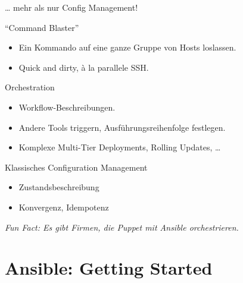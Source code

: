 \begin{frame}{\dots{} mehr als nur Config Management!}
  \begin{block}{"`Command Blaster"'}
    \begin{itemize}
      \item Ein Kommando auf eine ganze Gruppe von Hosts loslassen.
      \item Quick and dirty, à la parallele SSH.
    \end{itemize}
  \end{block}
  
  \begin{block}{Orchestration\footnotemark}
    \begin{itemize}
      \item Workflow-Beschreibungen.
      \item Andere Tools triggern, Ausführungsreihenfolge festlegen.
      \item Komplexe Multi-Tier Deployments, Rolling Updates, \dots
    \end{itemize}
  \end{block}

  \begin{block}{Klassisches Configuration Management}
    \begin{itemize}
      \item Zustandsbeschreibung
      \item Konvergenz, Idempotenz
    \end{itemize}
  \end{block}

  \emph{Fun Fact: Es gibt Firmen, die Puppet mit Ansible orchestrieren.}

\end{frame}



%
%


\section{Ansible: Getting Started}

